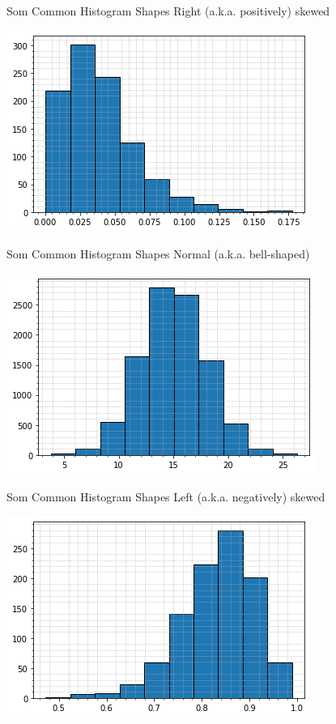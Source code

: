 \documentclass[t]{beamer}
\begin{document}
\begin{frame}{Som Common Histogram Shapes}
Right (a.k.a. positively) skewed
\begin{center}
\includegraphics[scale=0.55]{../Images/positive_skewed.png}
\end{center}
\end{frame}

\begin{frame}{Som Common Histogram Shapes}
Normal (a.k.a. bell-shaped)
\begin{center}
\includegraphics[scale=0.55]{../Images/normal1.png}
\end{center}
\end{frame}

\begin{frame}{Som Common Histogram Shapes}
Left (a.k.a. negatively) skewed
\begin{center}
\includegraphics[scale=0.55]{../Images/negative_skewed.png}
\end{center}
\end{frame}
\end{document}
